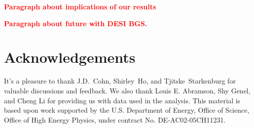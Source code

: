 \documentclass[12pt, letterpaper, preprint, tighten]{aastex62}
\newcommand{\todo}[1]{{\bf \textcolor{red}{#1}}}
\newcommand{\bitem}{\begin{itemize}}
\newcommand{\eitem}{\end{itemize}}
\begin{document}
\todo{Paragraph about implications of our results} 

\todo{Paragraph about future with DESI BGS.}




\section*{Acknowledgements}
It's a pleasure to thank 
    J.D.~Cohn, 
    Shirley~Ho, 
    and 
    Tjitske~Starkenburg 
for valuable discussions and feedback. We also thank Louis E. Abramson, 
Shy Genel, and Cheng Li for providing us with data used in the analysis. 
This material is based upon work supported by the U.S. Department
of Energy, Office of Science, Office of High Energy Physics, under
contract No. DE-AC02-05CH11231.



\end{document}
